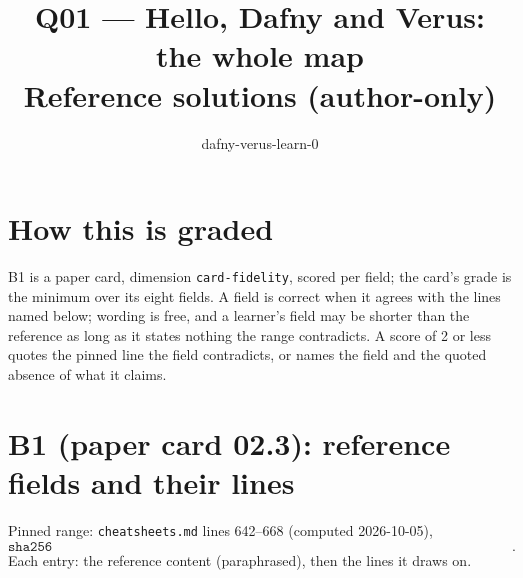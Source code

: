 \documentclass[11pt]{article}
\title{Q01 --- Hello, Dafny and Verus: the whole map \\ \large Reference solutions (author-only)}
\author{dafny-verus-learn-0}
\date{}
\begin{document}
\maketitle

\section*{How this is graded}
B1 is a paper card, dimension \texttt{card-fidelity}, scored per field; the
card's grade is the minimum over its eight fields. A field is correct when it
agrees with the lines named below; wording is free, and a learner's field may
be shorter than the reference as long as it states nothing the range
contradicts. A score of 2 or less quotes the pinned line the field contradicts,
or names the field and the quoted absence of what it claims.

\section*{B1 (paper card 02.3): reference fields and their lines}

Pinned range: \texttt{cheatsheets.md} lines 642--668 (computed 2026-10-05),
\[ \texttt{sha256 0cb3f94d3982d6d1826d4ef44b71a1a7b634d27d249086bc2281ef61febe5a38}. \]
Each entry: the reference content (paraphrased), then the lines it draws on.
\end{document}
